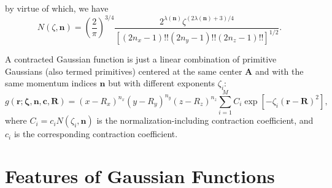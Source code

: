 \documentclass[11pt,a4paper]{article}
\begin{document}
	by virtue of which, we have
	\begin{equation}
		N(\zeta, \mathbf{n}) = \left(\frac{2}{\pi}\right)^{3 / 4} \frac{2^{\lambda(\mathbf{n})} \zeta^{(2 \lambda(\mathbf{n})+3) / 4}}{\left[\left(2 n_{x}-1\right) ! !\left(2 n_{y}-1\right) ! !\left(2 n_{z}-1\right) ! !\right]^{1 / 2}}.
	\end{equation}
	
	A contracted Gaussian function is just a linear combination of primitive Gaussians (also termed primitives) centered at the same center $\mathbf{A}$ and with the same momentum indices $\mathbf{n}$ but with different exponents $\zeta_i$:
	\begin{equation}
		g(\mathbf{r}; \boldsymbol{\zeta}, \mathbf{n}, \mathbf{c}, \mathbf{R}) = \left(x-R_{x}\right)^{n_{x}} \left(y-R_{y}\right)^{n_{y}} \left(z-R_{z}\right)^{n_{z}} \sum_{i=1}^{M} C_i \exp \left[ -\zeta_i (\mathbf{r} - \mathbf{R})^2 \right],
	\end{equation}
	where $C_i = c_i N(\zeta_i, \mathbf{n})$ is the normalization-including contraction coefficient, and $c_i$ is the corresponding contraction coefficient.
	
	
	\section{Features of Gaussian Functions}
	
\end{document}
